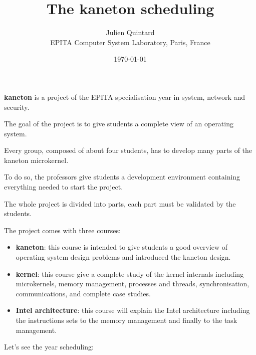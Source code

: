 \documentclass[10pt,a4wide]{article}
\title{The kaneton scheduling}
\author{\small{Julien Quintard} \\
        \scriptsize{EPITA Computer System Laboratory, Paris, France}}
\date{\scriptsize{\today}}
\begin{document}
\maketitle

%
%

\begin{multicols}{2}



\textbf{kaneton} is a project of the EPITA specialisation year in system,
network and security.

The goal of the project is to give students a complete view of an operating
system.

Every group, composed of about four students, has to develop many parts
of the kaneton microkernel.

To do so, the professors give students a development environment containing
everything needed to start the project.

The whole project is divided into parts, each part must be validated by
the students.

The project comes with three courses:

\begin{itemize}
  \item
    \textbf{kaneton}: this course is intended to give students a good overview
    of operating system design problems and introduced the kaneton design.
  \item
    \textbf{kernel}: this course give a complete study of the kernel
    internals including microkernels, memory management, processes and threads,
    synchronisation, communications, and complete case studies.
  \item
    \textbf{Intel architecture}: this course will explain the Intel
    architecture including the instructions sets to the memory management
    and finally to the task management.
\end{itemize}

Let's see the year scheduling:


\end{multicols}
\end{document}
